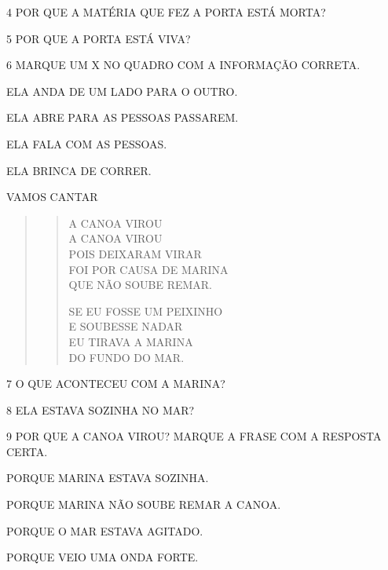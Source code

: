 \num{4} POR QUE A MATÉRIA QUE FEZ A PORTA ESTÁ MORTA?


\num{5} POR QUE A PORTA ESTÁ VIVA?


\num{6} MARQUE UM X NO QUADRO COM A INFORMAÇÃO CORRETA.

\begin{boxlist}
 ELA ANDA DE UM LADO PARA O OUTRO.

 ELA ABRE PARA AS PESSOAS PASSAREM.

 ELA FALA COM AS PESSOAS.

 ELA BRINCA DE CORRER.
\end{boxlist}

\pagebreak
VAMOS CANTAR

\begin{quote}
\begin{verse}
A CANOA VIROU\\
A CANOA VIROU\\
POIS DEIXARAM VIRAR\\
FOI POR CAUSA DE MARINA\\
QUE NÃO SOUBE REMAR.

SE EU FOSSE UM PEIXINHO\\
E SOUBESSE NADAR\\
EU TIRAVA A MARINA\\
DO FUNDO DO MAR.
\end{verse}

\end{quote}

\num{7} O QUE ACONTECEU COM A MARINA?


\num{8} ELA ESTAVA SOZINHA NO MAR?


\num{9} POR QUE A CANOA VIROU? MARQUE A FRASE COM A RESPOSTA CERTA.

\begin{boxlist}
 PORQUE MARINA ESTAVA SOZINHA.

 PORQUE MARINA NÃO SOUBE REMAR A CANOA.

 PORQUE O MAR ESTAVA AGITADO.

 PORQUE VEIO UMA ONDA FORTE.
\end{boxlist}

